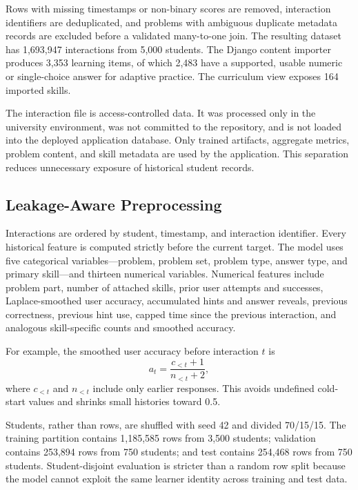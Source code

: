 \documentclass[conference]{IEEEtran}
\begin{document}
Rows with missing timestamps or non-binary scores are removed, interaction identifiers are deduplicated, and problems with ambiguous duplicate metadata records are excluded before a validated many-to-one join. The resulting dataset has 1,693,947 interactions from 5,000 students. The Django content importer produces 3,353 learning items, of which 2,483 have a supported, usable numeric or single-choice answer for adaptive practice. The curriculum view exposes 164 imported skills.

The interaction file is access-controlled data. It was processed only in the university environment, was not committed to the repository, and is not loaded into the deployed application database. Only trained artifacts, aggregate metrics, problem content, and skill metadata are used by the application. This separation reduces unnecessary exposure of historical student records.

\subsection{Leakage-Aware Preprocessing}
Interactions are ordered by student, timestamp, and interaction identifier. Every historical feature is computed strictly before the current target. The model uses five categorical variables---problem, problem set, problem type, answer type, and primary skill---and thirteen numerical variables. Numerical features include problem part, number of attached skills, prior user attempts and successes, Laplace-smoothed user accuracy, accumulated hints and answer reveals, previous correctness, previous hint use, capped time since the previous interaction, and analogous skill-specific counts and smoothed accuracy.

For example, the smoothed user accuracy before interaction $t$ is
\begin{equation}
a_t=\frac{c_{<t}+1}{n_{<t}+2},
\end{equation}
where $c_{<t}$ and $n_{<t}$ include only earlier responses. This avoids undefined cold-start values and shrinks small histories toward 0.5.

Students, rather than rows, are shuffled with seed 42 and divided 70/15/15. The training partition contains 1,185,585 rows from 3,500 students; validation contains 253,894 rows from 750 students; and test contains 254,468 rows from 750 students. Student-disjoint evaluation is stricter than a random row split because the model cannot exploit the same learner identity across training and test data.
\end{document}
